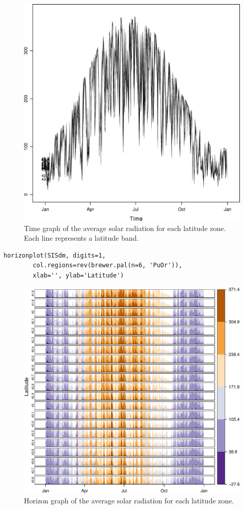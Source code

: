 \documentclass[smallroyalvopaper]{memoir}
\begin{document}
\begin{figure}[htb]
\centering
\includegraphics[width=.9\linewidth]{figs/SISmm_xyplot.png}
\caption{\label{fig:SISmm_xyplot}Time graph of the average solar radiation for each latitude zone. Each line represents a latitude band.}
\end{figure}


\lstset{language=R,numbers=none}
\begin{lstlisting}
horizonplot(SISdm, digits=1,
	    col.regions=rev(brewer.pal(n=6, 'PuOr')),
	    xlab='', ylab='Latitude')
\end{lstlisting}

\begin{figure}[htb]
\centering
\includegraphics[width=.9\linewidth]{figs/SISdm_horizonplot.pdf}
\caption{\label{fig:SISdm_horizonplot}Horizon graph of the average solar radiation for each latitude zone.}
\end{figure}
\end{document}
